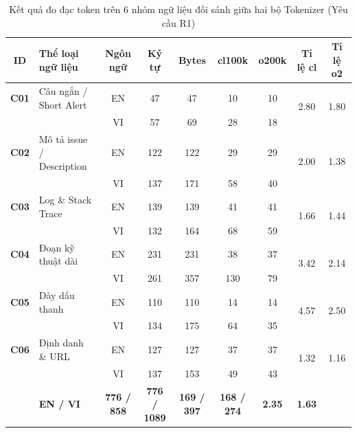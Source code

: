 \documentclass[11pt,a4paper]{article}
\begin{document}
\begin{table}[H]
  \centering
  \small
  \caption{Kết quả đo đạc token trên 6 nhóm ngữ liệu đối sánh giữa hai bộ Tokenizer (Yêu cầu R1)}
  \label{tab:tokens}
  \begin{tabularx}{\textwidth}{c p{3.8cm} c c c c c c c}
    \toprule
    \rowcolor{primary} \color{white}\textbf{ID} & \color{white}\textbf{Thể loại ngữ liệu} & \color{white}\textbf{Ngôn ngữ} & \color{white}\textbf{Ký tự} & \color{white}\textbf{Bytes} & \color{white}\textbf{cl100k} & \color{white}\textbf{o200k} & \color{white}\textbf{Tỉ lệ cl} & \color{white}\textbf{Tỉ lệ o2} \\
    \midrule
    \textbf{C01} & Câu ngắn / Short Alert & EN & 47 & 47 & 10 & 10 & \multirow{2}{*}{2.80} & \multirow{2}{*}{1.80} \\
                 &                        & VI & 57 & 69 & 28 & 18 & & \\
    \textbf{C02} & Mô tả issue / Description & EN & 122 & 122 & 29 & 29 & \multirow{2}{*}{2.00} & \multirow{2}{*}{1.38} \\
                 &                            & VI & 137 & 171 & 58 & 40 & & \\
    \textbf{C03} & Log \& Stack Trace         & EN & 139 & 139 & 41 & 41 & \multirow{2}{*}{1.66} & \multirow{2}{*}{1.44} \\
                 &                            & VI & 132 & 164 & 68 & 59 & & \\
    \textbf{C04} & Đoạn kỹ thuật dài          & EN & 231 & 231 & 38 & 37 & \multirow{2}{*}{3.42} & \multirow{2}{*}{2.14} \\
                 &                            & VI & 261 & 357 & 130 & 79 & & \\
    \textbf{C05} & Dày dấu thanh              & EN & 110 & 110 & 14 & 14 & \multirow{2}{*}{4.57} & \multirow{2}{*}{2.50} \\
                 &                            & VI & 134 & 175 & 64 & 35 & & \\
    \textbf{C06} & Định danh \& URL           & EN & 127 & 127 & 37 & 37 & \multirow{2}{*}{1.32} & \multirow{2}{*}{1.16} \\
                 &                            & VI & 137 & 153 & 49 & 43 & & \\
    \midrule
    \rowcolor{cardborder} \multicolumn{2}{l}{\textbf{TỔNG TOÀN BỘ 6 CẶP}} & \textbf{EN / VI} & \textbf{776 / 858} & \textbf{776 / 1089} & \textbf{169 / 397} & \textbf{168 / 274} & \textbf{2.35} & \textbf{1.63} \\
    \bottomrule
  \end{tabularx}
\end{table}
\end{document}
